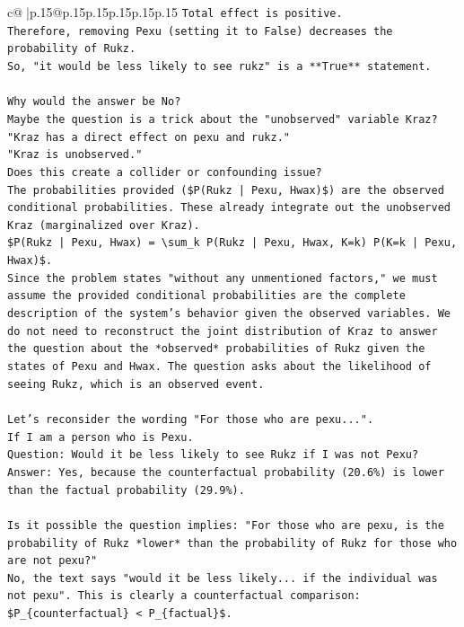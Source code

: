 \documentclass{article}
\begin{document}
{\begin{supertabular}{c@{$\;$}|p{.15\linewidth}@{}p{.15\linewidth}p{.15\linewidth}p{.15\linewidth}p{.15\linewidth}p{.15\linewidth}}
{{{\texttt{Total effect is positive.} \\
\texttt{Therefore, removing Pexu (setting it to False) decreases the probability of Rukz.} \\
\texttt{So, "it would be less likely to see rukz" is a **True** statement.} \\
\\ 
\texttt{Why would the answer be No?} \\
\texttt{Maybe the question is a trick about the "unobserved" variable Kraz?} \\
\texttt{"Kraz has a direct effect on pexu and rukz."} \\
\texttt{"Kraz is unobserved."} \\
\texttt{Does this create a collider or confounding issue?} \\
\texttt{The probabilities provided (\$P(Rukz | Pexu, Hwax)\$) are the observed conditional probabilities. These already integrate out the unobserved Kraz (marginalized over Kraz).} \\
\texttt{\$P(Rukz | Pexu, Hwax) = \textbackslash{}sum\_k P(Rukz | Pexu, Hwax, K=k) P(K=k | Pexu, Hwax)\$.} \\
\texttt{Since the problem states "without any unmentioned factors," we must assume the provided conditional probabilities are the complete description of the system's behavior given the observed variables. We do not need to reconstruct the joint distribution of Kraz to answer the question about the *observed* probabilities of Rukz given the states of Pexu and Hwax. The question asks about the likelihood of seeing Rukz, which is an observed event.} \\
\\ 
\texttt{Let's reconsider the wording "For those who are pexu...".} \\
\texttt{If I am a person who is Pexu.} \\
\texttt{Question: Would it be less likely to see Rukz if I was not Pexu?} \\
\texttt{Answer: Yes, because the counterfactual probability (20.6\%) is lower than the factual probability (29.9\%).} \\
\\ 
\texttt{Is it possible the question implies: "For those who are pexu, is the probability of Rukz *lower* than the probability of Rukz for those who are not pexu?"} \\
\texttt{No, the text says "would it be less likely... if the individual was not pexu". This is clearly a counterfactual comparison: \$P\_\{counterfactual\} < P\_\{factual\}\$.} \\
}}}
\end{supertabular}}
\end{document}
